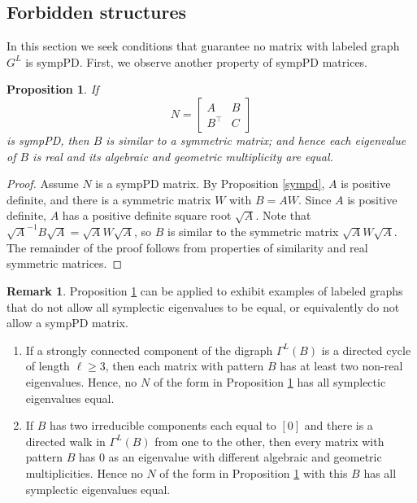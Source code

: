 \documentclass[12pt]{article}
\newtheorem{prop}[thm]{Proposition}
\theoremstyle{definition}
\newtheorem{rem}[thm]{Remark}
\theoremstyle{definition}
\theoremstyle{definition}
\numberwithin{figure}{section}
\numberwithin{equation}{section}
\newcommand{\trans}{^{\top}}
\newcommand{\bpf}{\begin{proof}}
\newcommand{\epf}{\end{proof}\ms}
\newcommand{\ms}{\medskip}
\begin{document}
\subsection{Forbidden structures}\label{ss:forbid}

In this section  we seek conditions  that guarantee no matrix
with labeled graph $G^L$ is
sympPD.  First, we observe another property of sympPD matrices. 


\begin{prop}\label{cor:bigraphblock}
If 
\[ 
\renewcommand{\arraystretch}{1.1}
N=\left[ \begin{array}{cc}
A & B \\  
B\trans & C
\end{array}
\right]
\]
is sympPD, then 
$B$ is similar to a symmetric matrix; 
and hence each eigenvalue of  $B$ is real
and its algebraic and  geometric multiplicity are equal.   
\end{prop}

\bpf
Assume $N$ is {a sympPD matrix}. 
By Proposition \ref{sympd},  $A$ is positive definite, and there is a symmetric matrix $W$ with $B=AW$.  Since $A$ is positive definite, $A$ has a positive definite square root $\sqrt{A}$.  Note that 
$\sqrt{A}^{-1}B\sqrt{A}= \sqrt{A}W\sqrt{A}$, 
so $B$ is similar to the symmetric matrix $\sqrt{A}W\sqrt{A}$. The remainder of the proof follows from properties of similarity and real symmetric matrices. 
\epf


\begin{rem}\label{rem:NOallequal}
Proposition \ref{cor:bigraphblock} can be applied to exhibit examples of labeled graphs that do not allow all symplectic eigenvalues to be equal, or equivalently do not allow a sympPD matrix.
\begin{enumerate}
\item \label{NOallequal1}
If  a strongly connected component of the digraph $\Gamma^L(B)$ is a directed cycle  of length $\ell \geq 3$,
then each matrix with pattern $B$ has 
at least two non-real eigenvalues.  Hence, no $N$ of 
the form in Proposition \ref{cor:bigraphblock}
has all symplectic eigenvalues equal.
\item \label{NOallequal2}
If  $B$ has two irreducible components 
each equal to $[0]$ and there is a directed walk in $\Gamma^L(B)$ from one to the other, then every matrix with pattern $B$ has 0 as an eigenvalue with different algebraic and geometric multiplicities.  Hence no   $N$ of 
the form in Proposition \ref{cor:bigraphblock} with this $B$  has all symplectic eigenvalues equal. 
\end{enumerate}
\end{rem}
\end{document}
